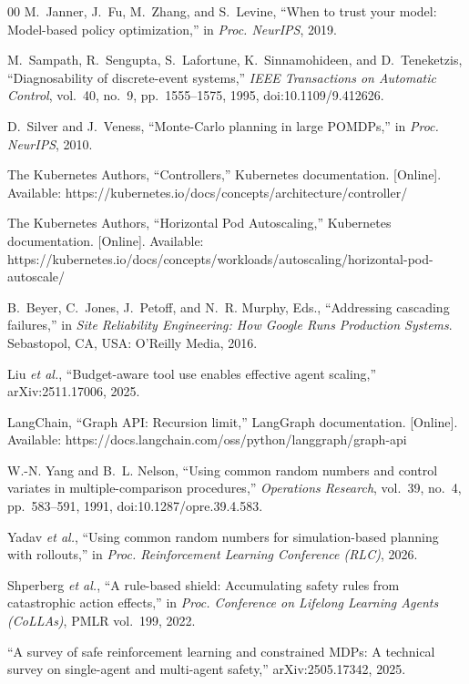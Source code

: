 \documentclass[conference]{IEEEtran}
\begin{document}
\begin{thebibliography}{00}
 M.~Janner, J.~Fu, M.~Zhang, and S.~Levine, ``When to trust your model: Model-based policy optimization,'' in \emph{Proc. NeurIPS}, 2019.

 M.~Sampath, R.~Sengupta, S.~Lafortune, K.~Sinnamohideen, and D.~Teneketzis, ``Diagnosability of discrete-event systems,'' \emph{IEEE Transactions on Automatic Control}, vol.~40, no.~9, pp.~1555--1575, 1995, doi:10.1109/9.412626.

 D.~Silver and J.~Veness, ``Monte-Carlo planning in large POMDPs,'' in \emph{Proc. NeurIPS}, 2010.

 The Kubernetes Authors, ``Controllers,'' Kubernetes documentation. [Online]. Available: https://kubernetes.io/docs/concepts/architecture/controller/

 The Kubernetes Authors, ``Horizontal Pod Autoscaling,'' Kubernetes documentation. [Online]. Available: https://kubernetes.io/docs/concepts/workloads/autoscaling/horizontal-pod-autoscale/

 B.~Beyer, C.~Jones, J.~Petoff, and N.~R. Murphy, Eds., ``Addressing cascading failures,'' in \emph{Site Reliability Engineering: How Google Runs Production Systems}. Sebastopol, CA, USA: O'Reilly Media, 2016.

 Liu \emph{et al.}, ``Budget-aware tool use enables effective agent scaling,'' arXiv:2511.17006, 2025.

 LangChain, ``Graph API: Recursion limit,'' LangGraph documentation. [Online]. Available: https://docs.langchain.com/oss/python/langgraph/graph-api

 W.-N. Yang and B.~L. Nelson, ``Using common random numbers and control variates in multiple-comparison procedures,'' \emph{Operations Research}, vol.~39, no.~4, pp.~583--591, 1991, doi:10.1287/opre.39.4.583.

 Yadav \emph{et al.}, ``Using common random numbers for simulation-based planning with rollouts,'' in \emph{Proc. Reinforcement Learning Conference (RLC)}, 2026.

 Shperberg \emph{et al.}, ``A rule-based shield: Accumulating safety rules from catastrophic action effects,'' in \emph{Proc. Conference on Lifelong Learning Agents (CoLLAs)}, PMLR vol.~199, 2022.

 ``A survey of safe reinforcement learning and constrained MDPs: A technical survey on single-agent and multi-agent safety,'' arXiv:2505.17342, 2025.


\end{thebibliography}
\end{document}
